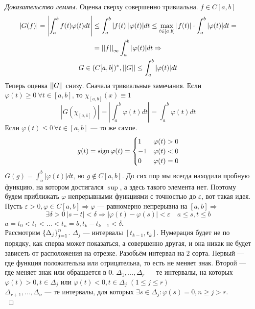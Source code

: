 \documentclass[document]{subfiles}
\begin{document}
\begin{proof}[Доказательство леммы]
    Оценка сверху совершенно тривиальна.
    $f \in C[a,b]$
    \begin{multline*}
        |G(f)| = \left| \int^b_a f(t) \varphi(t) dt \right| \leq \int^b_a |f(t)| |\varphi(t)| dt \leq \max_{t \in [a,b]} |f(t)| \cdot \int^b_a |\varphi(t)| dt = \\ =
        \left|\left| {f} \right| \right|_\infty \int^b_a |\varphi(t)| dt \Rightarrow \\
        G \in (C[a,b])^*, \left|\left| {G} \right| \right| \leq \int^b_a |\varphi(t)| dt
    \end{multline*}
    Теперь оценка $\left|\left| {G} \right| \right|$ снизу. Сначала тривиальные замечания. Если $\varphi(t) \geq 0 \: \forall t \in [a,b]$, то $\chi_{[a,b]}(x) \equiv 1$
    \[ |G(\chi_[a,b])| = \left| \int^b_a \varphi(t) dt \right| = \int^b_a \varphi(t) dt \]
    Если $\varphi(t) \leq 0 \, \forall t \in [a,b]$ --- то же самое.
    \[ g(t) = \mathrm{sign} \, \varphi(t) = \begin{cases}
        1 & \varphi(t) > 0 \\
        -1 & \varphi(t) < 0 \\
        0 &\varphi(t) = 0
    \end{cases} \]
    $G(g) = \int^b_a |\varphi(t)| dt$, но $g \notin C[a,b]$.
    До сих пор мы всегда находили пробную функцию, на котором достигался $\sup$, а здесь такого элемента нет.
    Поэтому будем приближать $\varphi$ непрерывными функциями  с точностью до $\varepsilon$, вот такая идея. \\
    Пусть $\varepsilon > 0, \varphi \in C[a,b] \Rightarrow \varphi$ --- равномерно непрерывна на $[a,b] \Rightarrow$
    \[ \exists \delta > 0 \: |s-t| < \delta \Rightarrow |\varphi(t) - \varphi(s)| < \varepsilon \quad a \leq s, t \leq b \]
    $a = t_0 < t_1 < \ldots < t_n = b, t_k - t_{k-1} < \delta$. \\
    Рассмотрим $\left\{\Delta_j\right\}^n_{j=1}$. $\Delta_j$ --- интервалы $[t_{k-1}, t_k]$.
    Нумерация будет не по порядку, как сперва может показаться, а совершенно другая, и она никак не будет зависеть от расположения на отрезке.
     Разобьём интервал на 2 сорта. Первый --- где функция положительна или отрицательна, то есть не меняет знак. Второй --- где меняет знак или обращается в 0.
    $\Delta_1, \ldots, \Delta_r$ --- те интервалы, на которых $\varphi(t) > 0, t \in \Delta_j$ или $\varphi(t) < 0, t \in \Delta_j$ $(1 \leq j \leq r)$ \\
    $\Delta_{r+1}, \ldots, \Delta_n$ --- те интервалы, для которых $\exists s \in \Delta_j : \varphi(s) = 0, n \geq j > r$. \\

\end{proof}
\end{document}
